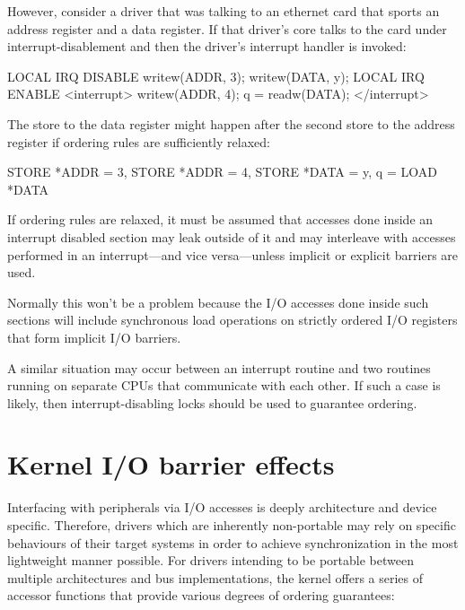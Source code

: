 However, consider a driver that was talking to an ethernet card that sports an
address register and a data register.
If that driver's core talks to the card under interrupt-disablement and then
the driver's interrupt handler is invoked:

\begin{VerbatimU}
	LOCAL IRQ DISABLE
	writew(ADDR, 3);
	writew(DATA, y);
	LOCAL IRQ ENABLE
	<interrupt>
	writew(ADDR, 4);
	q = readw(DATA);
	</interrupt>
\end{VerbatimU}

The store to the data register might happen after the second store to the
address register if ordering rules are sufficiently relaxed:

\begin{VerbatimU}
	STORE *ADDR = 3, STORE *ADDR = 4, STORE *DATA = y, q = LOAD *DATA
\end{VerbatimU}

If ordering rules are relaxed, it must be assumed that accesses done inside an
interrupt disabled section may leak outside of it and may interleave with
accesses performed in an interrupt---and vice versa---unless implicit or
explicit barriers are used.

Normally this won't be a problem because the I/O accesses done inside such
sections will include synchronous load operations on strictly ordered I/O
registers that form implicit I/O barriers.


A similar situation may occur between an interrupt routine and two routines
running on separate CPUs that communicate with each other.
If such a case is likely, then interrupt-disabling locks should be used to
guarantee ordering.


\section{Kernel I/O barrier effects}
\label{sec:Kernel I/O barrier effects}

Interfacing with peripherals via I/O accesses is deeply architecture and device
specific.
Therefore, drivers which are inherently non-portable may rely on specific
behaviours of their target systems in order to achieve synchronization
in the most lightweight manner possible.
For drivers intending to be portable between multiple architectures and
bus implementations, the kernel offers a series of accessor functions that
provide various degrees of ordering guarantees:

